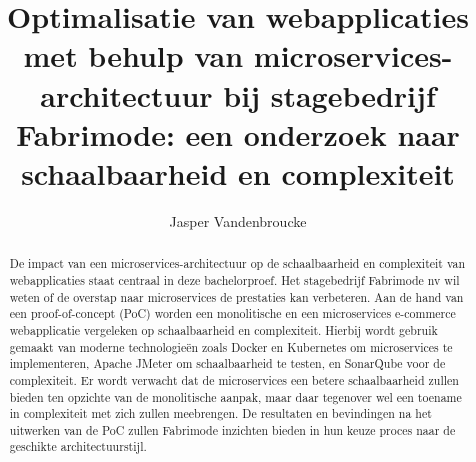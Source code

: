 \documentclass{hogent-article}
\title{Optimalisatie van webapplicaties met behulp van microservices-architectuur bij stagebedrijf Fabrimode: een onderzoek naar schaalbaarheid en complexiteit}
\author{Jasper Vandenbroucke}
\begin{document}
\begin{abstract}
  De impact van een microservices-architectuur op de schaalbaarheid en complexiteit van webapplicaties staat centraal in deze bachelorproef. Het stagebedrijf Fabrimode nv wil weten of de overstap naar microservices de prestaties kan verbeteren. Aan de hand van een proof-of-concept (PoC) worden een monolitische en een microservices e-commerce webapplicatie vergeleken op schaalbaarheid en complexiteit. Hierbij wordt gebruik gemaakt van moderne technologieën zoals Docker en Kubernetes om microservices te implementeren, Apache JMeter om schaalbaarheid te testen, en SonarQube voor de complexiteit. Er wordt verwacht dat de microservices een betere schaalbaarheid zullen bieden ten opzichte van de monolitische aanpak, maar daar tegenover wel een toename in complexiteit met zich zullen meebrengen. De resultaten en bevindingen na het uitwerken van de PoC zullen Fabrimode inzichten bieden in hun keuze proces naar de geschikte architectuurstijl.
\end{abstract}

\tableofcontents



\printbibliography[heading=bibintoc]
\end{document}
